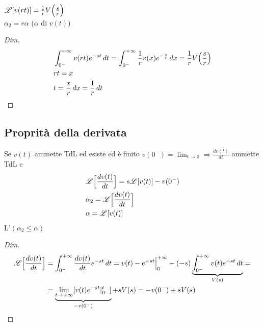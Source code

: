 $\mathscr{L}[v(rt)] = \frac{1}{r}V\Bigl(\frac{s}{r}\Bigr)$\\
$\alpha_2 = r\alpha$ ($\alpha$ \AdC di $v(t)$)

\begin{proof}[Dim]
   \[
      \begin{split}
         &\intZeroInfinity v(rt)e^{-st}\,dt = \intZeroInfinity \frac{1}{r}v(x)e^{-\frac{s}{t}}\,dx = \frac{1}{r}V\Bigl(\frac{s}{r}\Bigr)\\
         & rt = x\\
         & t = \frac{x}{r}\,dx = \frac{1}{r}\,dt %
      \end{split}
   \]
\end{proof}
\subsection{Proprità della derivata}
Se $v(t)$ ammette TdL ed esiste ed è finito $v(0^-) = \lim_{t\to 0} \Rightarrow \frac{dv(t)}{dt}$ ammette TdL e
\[
   \begin{split}
      & \mathscr{L}\Bigl[\frac{dv(t)}{dt}\Bigr] = s\mathscr{L}[v(t)] - v(0^-)\\
      & \alpha_2 = \mathscr{L}\Bigl[\frac{dv(t)}{dt}\Bigr]\\
      & \alpha = \mathscr{L}[v(t)]
   \end{split}
\]
L'\AdC $(\alpha_2 \le \alpha)$

\begin{proof}[Dim]
   \[
      \begin{split}
         \mathscr{L}\Bigl[\frac{dv(t)}{dt}\Bigr] & = \int_{0^-}^{+\infty} \frac{dv(t)}{dt}e^{-st}\,dt = v(t) - e^{-st}\Big|_{0^-}^{+\infty} - (-s)\underbrace{\int_{0^-}^{+\infty} v(t)e^{-st}\,dt}_{V(s)} =\\
         & = \underbrace{\lim_{t\to +\infty}[v(t)e^{-st}|_{0^-}^{t}]}_{-v(0^-)} + sV(s) = -v(0^-) + sV(s)\\
      \end{split}
   \]
\end{proof}
